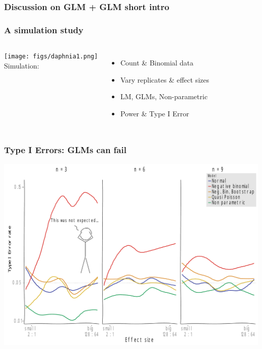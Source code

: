 \documentclass[
	12pt
	]{beamer}
\begin{document}
% 	


\begin{frame}
\frametitle{Discussion on GLM + GLM short intro}
\end{frame}


\begin{frame}
\frametitle{A simulation study}
	\begin{columns}[T]
		\texttt{[image: figs/daphnia1.png]}\\
		\vspace{2em}
		Simulation: 
		\begin{itemize}
			\item Count \& Binomial data
			\item Vary replicates \& effect sizes
			\item LM, GLMs, Non-parametric
			\item Power \& Type I Error
		\end{itemize}
		\begin{adjustbox}{max totalsize={\textwidth}{\textheight}}
					
		\end{adjustbox}
	\end{columns}
\end{frame}



\begin{frame}
\frametitle{Type I Errors: GLMs can fail}
	\begin{center}
		\includegraphics[width=\textwidth]{figs/p_t1_xkcd.pdf}
	\end{center}
\end{frame}
\end{document}
